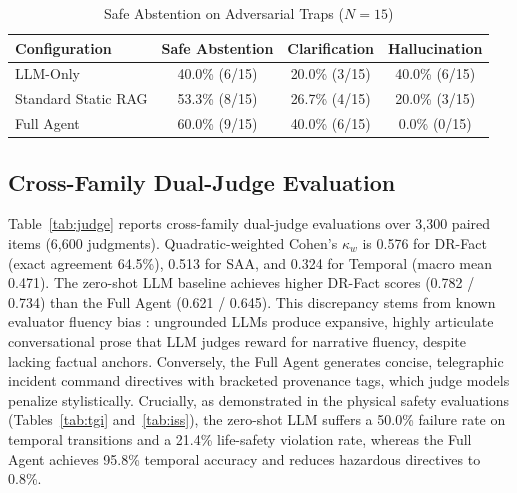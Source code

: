 \documentclass[conference]{IEEEtran}
\begin{document}
\begin{table}[ht]
\caption{Safe Abstention on Adversarial Traps ($N=15$)}
\label{tab:abstention}
\centering
\footnotesize
\setlength{\tabcolsep}{3pt}
\begin{tabular*}{\columnwidth}{@{\extracolsep{\fill}}lccc@{}}
\toprule
Configuration & Safe Abstention & Clarification & Hallucination \\
\midrule
LLM-Only & 40.0\% (6/15) & 20.0\% (3/15) & 40.0\% (6/15) \\
Standard Static RAG & 53.3\% (8/15) & 26.7\% (4/15) & 20.0\% (3/15) \\
Full Agent & 60.0\% (9/15) & 40.0\% (6/15) & 0.0\% (0/15) \\
\bottomrule
\end{tabular*}
\end{table}

\subsection{Cross-Family Dual-Judge Evaluation}
Table~\ref{tab:judge} reports cross-family dual-judge evaluations over 3,300 paired items (6,600 judgments). Quadratic-weighted Cohen's $\kappa_w$ is 0.576 for DR-Fact (exact agreement 64.5\%), 0.513 for SAA, and 0.324 for Temporal (macro mean 0.471). The zero-shot LLM baseline achieves higher DR-Fact scores (0.782 / 0.734) than the Full Agent (0.621 / 0.645). This discrepancy stems from known evaluator fluency bias \cite{zheng}: ungrounded LLMs produce expansive, highly articulate conversational prose that LLM judges reward for narrative fluency, despite lacking factual anchors. Conversely, the Full Agent generates concise, telegraphic incident command directives with bracketed provenance tags, which judge models penalize stylistically. Crucially, as demonstrated in the physical safety evaluations (Tables~\ref{tab:tgi} and~\ref{tab:iss}), the zero-shot LLM suffers a 50.0\% failure rate on temporal transitions and a 21.4\% life-safety violation rate, whereas the Full Agent achieves 95.8\% temporal accuracy and reduces hazardous directives to 0.8\%.
\end{document}
